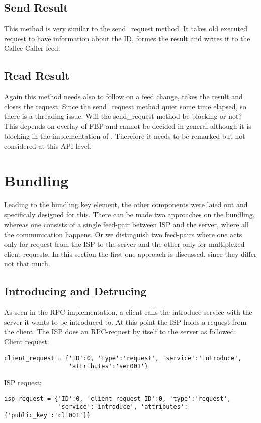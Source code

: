\subsection{Send Result}

This method is very similar to the send\_request method. It takes old executed request to have information about the ID, formes the result and writes it to the Callee-Caller feed.
\subsection{Read Result}

Again this method needs also to follow on a feed change, takes the result and closes the request. Since the send\_request method quiet some time elapsed, so there is a threading issue. Will the send\_request method be blocking or not? This depends on overlay of FBP and cannot be decided in general although it is blocking in the implementation of \citet{birrell1984implementing}. Therefore it needs to be remarked but not considered at this API level.

\section{Bundling}
Leading to the bundling key element, the other components were laied out and specificaly designed for this. There can be made two approaches on the bundling, whereas one consists of a single feed-pair between ISP and the server, where all the communication happens. Or we distinguish two feed-pairs where one acts only for request from the ISP to the server and the other only for multiplexed client requests. In this section the first one approach is discussed, since they differ not that much.
\subsection{Introducing and Detrucing}
As seen in the RPC implementation, a client calls the introduce-service with the server it wants to be introduced to. At this point the ISP holds a request from the client. The ISP does an RPC-request by itself to the server as followed:
\\
Client request: \begin{lstlisting}
client_request = {'ID':0, 'type':'request', 'service':'introduce', 
                  'attributes':'ser001'}
\end{lstlisting}
ISP request: 
\begin{lstlisting}
isp_request = {'ID':0, 'client_request_ID':0, 'type':'request', 
               'service':'introduce', 'attributes':{'public_key':'cli001'}}
\end{lstlisting}


